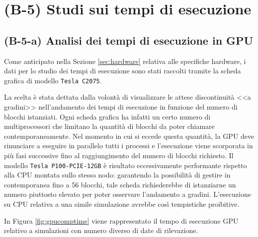 \lipsum[1-3]


\section{(B-5) Studi sui tempi di esecuzione} \label{sec:comptime}
\subsection{(B-5-a) Analisi dei tempi di esecuzione in GPU}
Come anticipato nella Sezione \ref{sec:hardware} relativa alle specifiche hardware, i dati per lo studio dei tempi di esecuzione sono stati raccolti tramite la scheda grafica di modello \verb|Tesla C2075|.

La scelta è stata dettata dalla volontà di visualizzare le attese discontinuità <<a gradini>> nell'andamento dei tempi di esecuzione in funzione del numero di blocchi istanziati. Ogni scheda grafica ha infatti un certo numero di multiprocessori che limitano la quantità di blocchi da poter chiamare contemporaneamente. Nel momento in cui si eccede questa quantità, la GPU deve rinunciare a eseguire in parallelo tutti i processi e l'esecuzione viene scorporata in più fasi successive fino al raggiungimento del numero di blocchi richiesto.
Il modello \verb|Tesla P100-PCIE-12GB| è risultato eccessivamente performante rispetto alla CPU montata sullo stesso nodo: garantendo la possibilità di gestire in contemporanea fino a 56 blocchi, tale scheda richiederebbe di istanziarne un numero piuttosto elevato per poter osservare l'andamento a gradini. L'esecuzione su CPU relativa a una simile simulazione avrebbe così tempistiche proibitive.

In Figura \ref{fig:gpucomptime} viene rappresentato il tempo di esecuzione GPU relativo a simulazioni con numero diverso di date di rilevazione.

